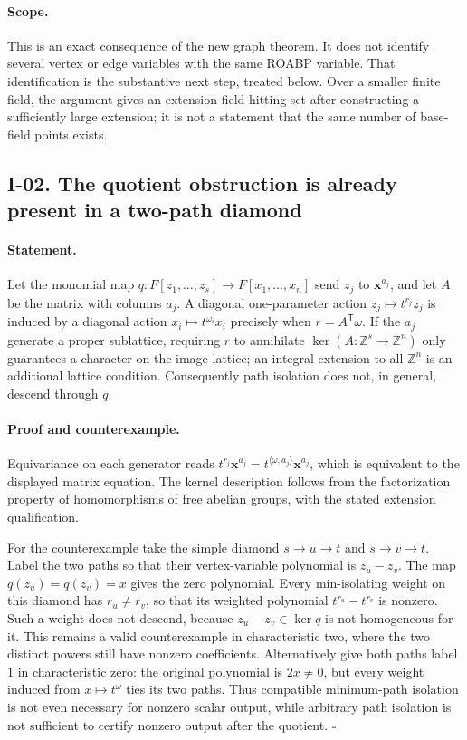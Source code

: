 \documentclass[11pt,a4paper]{article}
\theoremstyle{definition}\newtheorem{definition}{Definition}
\begin{document}
\paragraph{Scope.}
This is an exact consequence of the new graph theorem.  It does not
identify several vertex or edge variables with the same ROABP variable.
That identification is the substantive next step, treated below.
Over a smaller finite field, the argument gives an extension-field
hitting set after constructing a sufficiently large extension; it is
not a statement that the same number of base-field points exists.

\subsection{I-02. The quotient obstruction is already present in a two-path diamond}
\label{I-02}

\paragraph{Statement.}
Let the monomial map $q:F[z_1,\ldots,z_s]\longrightarrow
F[x_1,\ldots,x_n]$ send $z_j$ to $\mathbf x^{a_j}$, and let $A$ be
the matrix with columns $a_j$.  A diagonal one-parameter action
$z_j\mapsto t^{r_j}z_j$ is induced by a diagonal action
$x_i\mapsto t^{\omega_i}x_i$ precisely when
$r=A^{\mathsf T}\omega$.  If the $a_j$ generate a proper sublattice,
requiring $r$ to annihilate $\ker(A:\mathbb Z^s\to\mathbb Z^n)$
only guarantees a character on the image lattice; an integral
extension to all $\mathbb Z^n$ is an additional lattice condition.
Consequently path isolation does not, in general, descend through $q$.

\paragraph{Proof and counterexample.}
Equivariance on each generator reads
$t^{r_j}\mathbf x^{a_j}=t^{\langle\omega,a_j\rangle}\mathbf x^{a_j}$,
which is equivalent to the displayed matrix equation.  The kernel
description follows from the factorization property of homomorphisms
of free abelian groups, with the stated extension qualification.

For the counterexample take the simple diamond
$s\to u\to t$ and $s\to v\to t$.  Label the two paths so that their
vertex-variable polynomial is $z_u-z_v$.  The map $q(z_u)=q(z_v)=x$
gives the zero polynomial.  Every min-isolating weight on this diamond
has $r_u\ne r_v$, so that its weighted polynomial
$t^{r_u}-t^{r_v}$ is nonzero.  Such a weight does not descend, because
$z_u-z_v\in\ker q$ is not homogeneous for it.  This remains a valid
counterexample in characteristic two, where the two distinct powers
still have nonzero coefficients.  Alternatively give both paths label
$1$ in characteristic zero: the original polynomial is $2x\ne0$,
but every weight induced from $x\mapsto t^{\omega}$ ties its two paths.
Thus compatible minimum-path isolation is not even necessary for
nonzero scalar output, while arbitrary path isolation is not sufficient
to certify nonzero output after the quotient. \hfill$\square$
\end{document}
